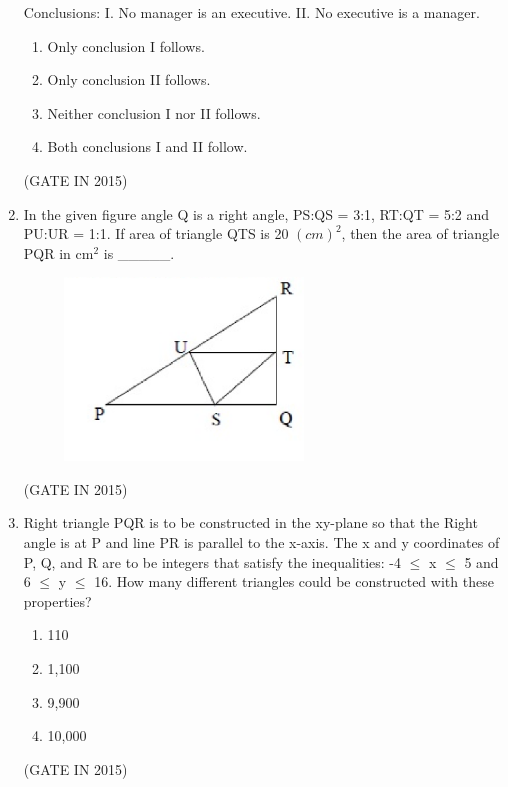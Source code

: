 \documentclass[journal]{IEEEtran}
\begin{document}
\begin{enumerate}
Conclusions:
I. No manager is an executive.
II. No executive is a manager.


\begin{enumerate}
\item Only conclusion I follows.
\item Only conclusion II follows.
\item Neither conclusion I nor II follows.
\item Both conclusions I and II follow.
\end{enumerate}
 \hfill(GATE IN 2015)

\item In the given figure angle Q is a right angle, PS:QS = 3:1, RT:QT = 5:2 and PU:UR = 1:1. If area of triangle QTS is 20 $(cm)^2$, then the area of triangle PQR in cm$^2$ is \_\_\_\_\_.
\begin{figure}[H]
    \centering
      \includegraphics[width=0.6\textwidth]{1.png} 
      \caption{}
    \label{fig:fig1} 
\end{figure}
 \hfill(GATE IN 2015)

\item Right triangle PQR is to be constructed in the xy-plane so that the Right angle is at P and line PR is parallel to the x-axis. The x and y coordinates of P, Q, and R are to be integers that satisfy the inequalities: -4 $\leq$ x $\leq$ 5 and 6 $\leq$ y $\leq$ 16. How many different triangles could be constructed with these properties?

\begin{multicols}{4}
\begin{enumerate}
\item 110
\item 1,100
\item 9,900
\item 10,000
\end{enumerate}
  \end{multicols} \hfill(GATE IN 2015)


\end{enumerate}
\end{document}
